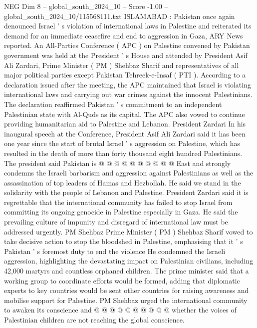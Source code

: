 \begin{textsample}{NEG Dim 8 – global\_south\_2024\_10 – Score -1.00 – global\_south\_2024\_10/115568111.txt}  \label{ex:f8_neg_147}
ISLAMABAD : Pakistan once again denounced Israel ' s violation of international laws in Palestine and reiterated its demand for an immediate ceasefire and end to aggression in Gaza, ARY News reported.
An All-Parties Conference ( APC ) on Palestine convened by Pakistan government was held at the President ' s House and attended by President Asif Ali Zardari, Prime Minister ( PM ) Shehbaz Sharif and representatives of all major political parties except Pakistan Tehreek-e-Insaf ( PTI ).
According to a declaration issued after the meeting, the APC maintained that Israel is violating international laws and carrying out war crimes against the innocent Palestinians.
The declaration reaffirmed Pakistan ' s commitment to an independent Palestinian state with Al-Quds as its capital.
The APC also vowed to continue providing humanitarian aid to Palestine and Lebanon.
President Zardari In his inaugural speech at the Conference, President Asif Ali Zardari said it has been one year since the start of brutal Israel ' s aggression on Palestine, which has resulted in the death of more than forty thousand eight hundred Palestinians.
The president said Pakistan is @ @ @ @ @ @ @ @ @ @ East and strongly condemns the Israeli barbarism and aggression against Palestinians as well as the assassination of top leaders of Hamas and Hezbollah.
He said we stand in the solidarity with the people of Lebanon and Palestine.
President Zardari said it is regrettable that the international community has failed to stop Israel from committing its ongoing genocide in Palestine especially in Gaza.
He said the prevailing culture of impunity and disregard of international law must be addressed urgently.
PM Shehbaz Prime Minister ( PM ) Shehbaz Sharif vowed to take decisive action to stop the bloodshed in Palestine, emphasising that it ' s Pakistan ' s foremost duty to end the violence He condemned the Israeli aggression, highlighting the devastating impact on Palestinian civilians, including 42,000 martyrs and countless orphaned children.
The prime minister said that a working group to coordinate efforts would be formed, adding that diplomatic experts to key countries would be sent other countries for raising awareness and mobilise support for Palestine.
PM Shehbaz urged the international community to awaken its conscience and @ @ @ @ @ @ @ @ @ @ whether the voices of Palestinian children are not reaching the global conscience.

\end{textsample}
